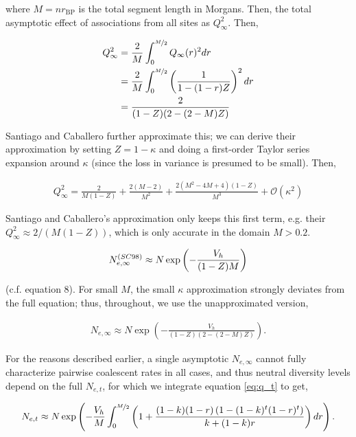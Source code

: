 \documentclass[11pt]{article}
\begin{document}
where $M = n r_\text{BP}$ is the total segment length in Morgans. Then, the
total asymptotic effect of associations from all sites as $Q_\infty^2$.  Then,

\begin{align}
  Q_\infty^2 &= \frac{2}{M}\int_0^{\nicefrac{M}{2}} Q_{\infty}(r)^2 dr  \\
  &=  \frac{2}{M} \int_0^{\nicefrac{M}{2}} \left(\frac{1}{1 - (1-r)Z}\right)^2 dr  \\
  &= \frac{2}{(1-Z) (2-(2-M) Z)}
\end{align}

Santiago and Caballero further approximate this; we can derive their
approximation by setting $Z = 1-\kappa$ and doing a first-order Taylor series
expansion around $\kappa$ (since the loss in variance is presumed to be small).
Then,

\begin{align}
  Q_\infty^2 = \frac{2}{M (1-Z)} + \frac{2 (M-2)}{M^2}+\frac{2 \left(M^2-4 M+4\right) (1-Z)}{M^3} + \mathcal{O}(\kappa^2)
\end{align}

Santiago and Caballero's approximation only keeps this first term, e.g. their
$Q_\infty^2 \approx 2/(M(1-Z))$, which is only accurate in the domain $M >
0.2$. 

\begin{align}
  N_{e,\infty}^{\text(SC98)} \approx N \exp\left(-\frac{V_h}{(1-Z)M}\right) 
\end{align}

(c.f. \cite{Santiago1998-bs} equation 8). For small $M$, the small $\kappa$
approximation strongly deviates from the full equation; thus, throughout, we
use the unapproximated version,

\begin{align}
  \label{eq:Ne_inf}
  N_{e,\infty} \approx N \exp\left(-\frac{V_h}{(1-Z) (2-(2-M) Z)} \right).
\end{align}

For the reasons described earlier, a single asymptotic $N_{e,\infty}$ cannot
fully characterize pairwise coalescent rates in all cases, and thus neutral
diversity levels depend on the full $N_{e,t}$, for which we integrate equation
\eqref{eq:q_t} to get,

\begin{align}
  \label{eq:net_integral}
  N_{e,t} \approx N \exp\left(-\frac{V_h}{M} \int_0^{\nicefrac{M}{2}} \left(1+\frac{(1-k) (1-r) \left(1-(1-k)^t (1-r)^t\right)}{k+(1-k)r} \right) dr \right).
\end{align}
\end{document}
